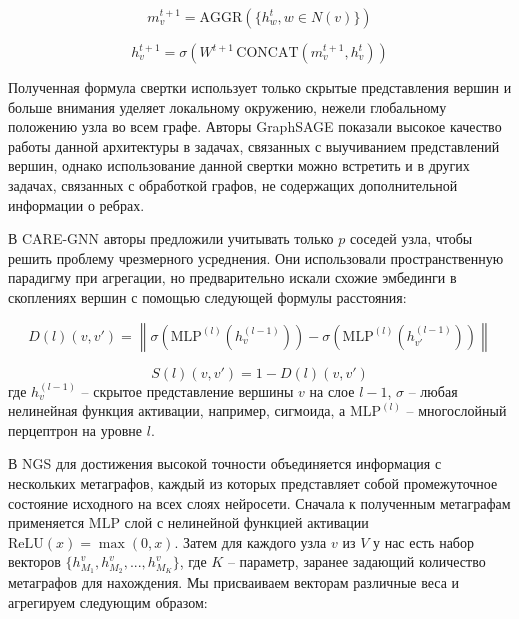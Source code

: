 \begin{equation}
    m_v^{t+1} = \text{AGGR} \left( \{h_w^t, w \in N(v)\} \right)
\end{equation}

\begin{equation}
    h_v^{t+1} = \sigma \left( W^{t+1} \, \text{CONCAT}(m_v^{t+1},h_v^t) \right)
\end{equation}

Полученная формула свертки использует только скрытые представления вершин и больше внимания уделяет локальному окружению, нежели глобальному положению узла во всем графе. Авторы GraphSAGE \cite{hamilton2017} показали высокое качество работы данной архитектуры в задачах, связанных с выучиванием представлений вершин, однако использование данной свертки можно встретить и в других задачах, связанных с обработкой графов, не содержащих дополнительной информации о ребрах.

В CARE-GNN \cite{dou2020} авторы предложили учитывать только \(p\) соседей узла, чтобы решить проблему чрезмерного усреднения. Они использовали пространственную парадигму при агрегации, но предварительно искали схожие эмбединги в скоплениях вершин с помощью следующей формулы расстояния:

\begin{equation}
    D(l)(v, v') = \left\| \sigma \left( \text{MLP}^{(l)} \left( h_v^{(l-1)} \right) \right) - \sigma \left( \text{MLP}^{(l)} \left( h_{v'}^{(l-1)} \right) \right) \right\|
\end{equation}

\begin{equation}
    S(l)(v, v') = 1 - D(l)(v, v')
\end{equation}
где \( h_v^{(l-1)} \) -- скрытое представление вершины \(v\) на слое \( l-1 \), \( \sigma \) -- любая нелинейная функция активации, например, сигмоида, а \( \text{MLP}^{(l)} \) -- многослойный перцептрон на уровне \( l \).

В NGS \cite{qin2022} для достижения высокой точности объединяется информация с нескольких метаграфов, каждый из которых представляет собой промежуточное состояние исходного на всех слоях нейросети. Сначала к полученным метаграфам применяется \(\text{MLP}\) слой с нелинейной функцией активации \(\text{ReLU}(x) = \max(0, x)\). Затем для каждого узла \(v\) из \(V\) у нас есть набор векторов \(\{h_{M_1}^v, h_{M_2}^v, ..., h_{M_K}^v\}\), где \(K\) -- параметр, заранее задающий количество метаграфов для нахождения. Мы присваиваем векторам различные веса и агрегируем следующим образом:

